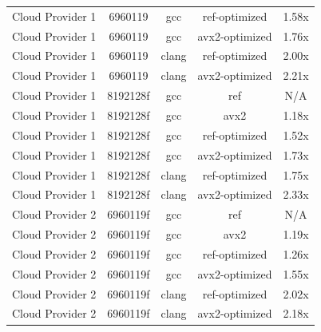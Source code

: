 \begin{table}[H]
\begin{tabularx}{\linewidth}{X c c c c}
            Cloud Provider 1 &              6960119 &                  gcc &        ref-optimized &                1.58x\\
            Cloud Provider 1 &              6960119 &                  gcc &       avx2-optimized &                1.76x\\
            Cloud Provider 1 &              6960119 &                clang &        ref-optimized &                2.00x\\
            Cloud Provider 1 &              6960119 &                clang &       avx2-optimized &                2.21x\\
            Cloud Provider 1 &             8192128f &                  gcc &                  ref &                  N/A\\
            Cloud Provider 1 &             8192128f &                  gcc &                 avx2 &                1.18x\\
            Cloud Provider 1 &             8192128f &                  gcc &        ref-optimized &                1.52x\\
            Cloud Provider 1 &             8192128f &                  gcc &       avx2-optimized &                1.73x\\
            Cloud Provider 1 &             8192128f &                clang &        ref-optimized &                1.75x\\
            Cloud Provider 1 &             8192128f &                clang &       avx2-optimized &                2.33x\\
            Cloud Provider 2 &             6960119f &                  gcc &                  ref &                  N/A\\
            Cloud Provider 2 &             6960119f &                  gcc &                 avx2 &                1.19x\\
            Cloud Provider 2 &             6960119f &                  gcc &        ref-optimized &                1.26x\\
            Cloud Provider 2 &             6960119f &                  gcc &       avx2-optimized &                1.55x\\
            Cloud Provider 2 &             6960119f &                clang &        ref-optimized &                2.02x\\
            Cloud Provider 2 &             6960119f &                clang &       avx2-optimized &                2.18x\\

\end{tabularx}
\end{table}
